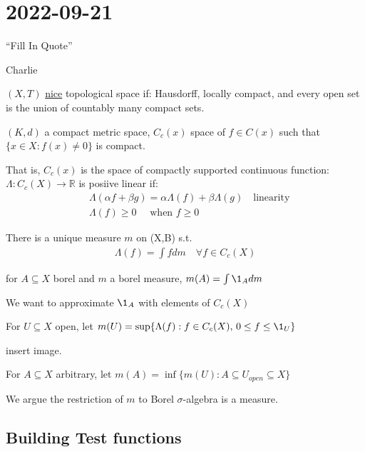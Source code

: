 \section{2022-09-21}

\epigraph{``Fill In Quote''}{Charlie}

\begin{theorem}
	$(X,T)$ \underline{nice} topological space if: Hausdorff, locally compact, and every open set is the union of countably many compact sets.
\end{theorem}

\begin{example}
	$(K,d)$ a compact metric space, $C_c (x)$ space of $f \in C(x)$ such that $\{x\in X: f(x) \neq 0 \}$ is compact.

	That is, $C_c (x)$ is the space of compactly supported continuous function:
		$\Lambda : C_c(X) \to \mathbb{R}$ is posiive linear if:
	\begin{align*}
		&\Lambda(\alpha f + \beta g) = \alpha \Lambda(f) + \beta \Lambda(g) \quad \text{linearity} \\
		&\Lambda(f) \geq 0 \quad \text{ when } f \geq 0
	\end{align*} 
\end{example}


\begin{theorem}
	There is a unique measure $m$ on (X,B) s.t.
	\begin{align*}
		\Lambda(f) = \int f dm \quad \forall f \in C_c (X)
	\end{align*} 
\end{theorem}

\begin{definition}[defining m]
	for $A \subseteq X$ borel and $m$ a borel measure, $m(A) = \int \1_{A} dm$
\end{definition}

We want to approximate $\1_A$ with elements of $C_c (X)$

For $U \subseteq X $ open, let $m(U) = \sup\{\Lambda (f) : f \in C_c (X), \, 0 \leq f \leq \1_{U} \}$

insert image.

For $A \subseteq X$ arbitrary, let $m(A) = \inf\{m(U) : A \subseteq U_{open} \subseteq X\}$

We argue the restriction of $m$ to Borel $\sigma$-algebra is a measure.

\subsection{Building Test functions}

